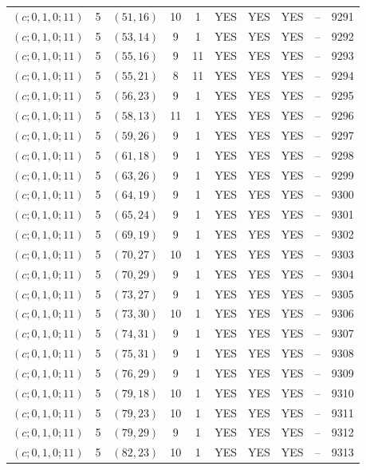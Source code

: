 \begin{longtable}{|c|c|c|c|c|c|c|c|c|c|}
$(c; 0, 1, 0; 11)$ & 5 & $(51, 16)$ & 10 & 1 & YES & YES & YES & -- & 9291\\
$(c; 0, 1, 0; 11)$ & 5 & $(53, 14)$ & 9 & 1 & YES & YES & YES & -- & 9292\\
$(c; 0, 1, 0; 11)$ & 5 & $(55, 16)$ & 9 & 11 & YES & YES & YES & -- & 9293\\
$(c; 0, 1, 0; 11)$ & 5 & $(55, 21)$ & 8 & 11 & YES & YES & YES & -- & 9294\\
$(c; 0, 1, 0; 11)$ & 5 & $(56, 23)$ & 9 & 1 & YES & YES & YES & -- & 9295\\
$(c; 0, 1, 0; 11)$ & 5 & $(58, 13)$ & 11 & 1 & YES & YES & YES & -- & 9296\\
$(c; 0, 1, 0; 11)$ & 5 & $(59, 26)$ & 9 & 1 & YES & YES & YES & -- & 9297\\
$(c; 0, 1, 0; 11)$ & 5 & $(61, 18)$ & 9 & 1 & YES & YES & YES & -- & 9298\\
$(c; 0, 1, 0; 11)$ & 5 & $(63, 26)$ & 9 & 1 & YES & YES & YES & -- & 9299\\
$(c; 0, 1, 0; 11)$ & 5 & $(64, 19)$ & 9 & 1 & YES & YES & YES & -- & 9300\\
$(c; 0, 1, 0; 11)$ & 5 & $(65, 24)$ & 9 & 1 & YES & YES & YES & -- & 9301\\
$(c; 0, 1, 0; 11)$ & 5 & $(69, 19)$ & 9 & 1 & YES & YES & YES & -- & 9302\\
$(c; 0, 1, 0; 11)$ & 5 & $(70, 27)$ & 10 & 1 & YES & YES & YES & -- & 9303\\
$(c; 0, 1, 0; 11)$ & 5 & $(70, 29)$ & 9 & 1 & YES & YES & YES & -- & 9304\\
$(c; 0, 1, 0; 11)$ & 5 & $(73, 27)$ & 9 & 1 & YES & YES & YES & -- & 9305\\
$(c; 0, 1, 0; 11)$ & 5 & $(73, 30)$ & 10 & 1 & YES & YES & YES & -- & 9306\\
$(c; 0, 1, 0; 11)$ & 5 & $(74, 31)$ & 9 & 1 & YES & YES & YES & -- & 9307\\
$(c; 0, 1, 0; 11)$ & 5 & $(75, 31)$ & 9 & 1 & YES & YES & YES & -- & 9308\\
$(c; 0, 1, 0; 11)$ & 5 & $(76, 29)$ & 9 & 1 & YES & YES & YES & -- & 9309\\
$(c; 0, 1, 0; 11)$ & 5 & $(79, 18)$ & 10 & 1 & YES & YES & YES & -- & 9310\\
$(c; 0, 1, 0; 11)$ & 5 & $(79, 23)$ & 10 & 1 & YES & YES & YES & -- & 9311\\
$(c; 0, 1, 0; 11)$ & 5 & $(79, 29)$ & 9 & 1 & YES & YES & YES & -- & 9312\\
$(c; 0, 1, 0; 11)$ & 5 & $(82, 23)$ & 10 & 1 & YES & YES & YES & -- & 9313\\

\end{longtable}
